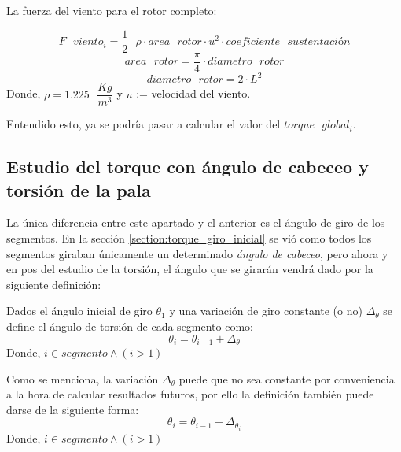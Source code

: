  
 \begin{definicion}
 La fuerza del viento para el rotor completo:
 
 $$ F \text{ } viento_i = \dfrac{1}{2} \text{ } \rho \cdot area \text{ } rotor \cdot u^2 \cdot coeficiente \text{ } sustentación$$
 $$ area \text{ } rotor = \dfrac{\pi}{4} \cdot diametro \text{ } rotor $$
 $$ diametro \text{ } rotor = 2 \cdot L^2 $$
Donde,
 \centering  $\rho = 1.225 \text{ } \dfrac{Kg}{m^3}$ y $u$ := velocidad del viento.
 \label{def:fuerza_viento_inicial}
 \end{definicion}
 
\vspace{15pt} Entendido esto, ya se podría pasar a calcular el valor del $torque \text{ } global_i$.
 
 
 
 
 
 
 
 
 
 
 
 
 \subsection{Estudio del torque con ángulo de cabeceo y torsión de la pala}
\label{section:torque_giro_torsion}

La única diferencia entre este apartado y el anterior es el ángulo de giro de los segmentos. En la sección \ref{section:torque_giro_inicial} se vió como todos los segmentos giraban únicamente un determinado \textit{ángulo de cabeceo}, pero ahora y en pos del estudio de la torsión, el ángulo que se girarán vendrá dado por la siguiente definición: 


\begin{definicion}
Dados el ángulo inicial de giro $\theta_1 $ y una variación de giro constante (o no) $\Delta_\theta$ se define el ángulo de torsión de cada segmento como:
$$\theta_i = \theta_{i-1} + \Delta_\theta$$ 
Donde,
\centering $i \in segmento \wedge (i > 1)$

\label{def:theta_cte}
\end{definicion}


\begin{definicion}
Como se menciona, la variación $\Delta_\theta$ puede que no sea constante por conveniencia a la hora de calcular resultados futuros, por ello la definición también puede darse de la siguiente forma:
$$\theta_i = \theta_{i-1} + \Delta_{\theta_{i}}$$ 
Donde,
\centering $i \in segmento \wedge (i > 1)$
\label{def:theta_nocte}
\end{definicion}


